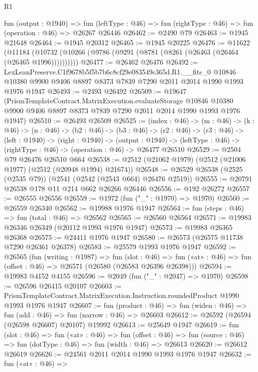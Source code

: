 \begin{lexlean}{R1}
\begin{coremodule}
  fun (output : @1940) =>
  fun (leftType : @46) => fun (rightType : @46) => fun (operation : @46) => @26267 @26446
@26462 := @2490 @79
@26463 := @1945 @21648
@26464 := @1945 @20312
@26465 := @1945 @20225
@26476 := @11622
    (@11184 (@10732 (@10266 (@9786 (@9291 (@8781 (@8261 (@26463 (@26464 (@26465 @1996))))))))))
@26477 := @26462 @26476
@26492 := LexLeanPreserve.C1f9678b5f5b7b6c8cf29e083549c365d.R1.__fits_0
    @10846
    @10380
    @9900
    @9406
    @8897
    @8373
    @7839
    @7290
    @2011
    @2014
    @1990
    @1993
    @1976
    @1947
@26493 := @2493 @26492
@26509 := @19647
    (PrismTemplateContract.MatrixExecution.evaluateStorage
      @10846
      @10380
      @9900
      @9406
      @8897
      @8373
      @7839
      @7290
      @2011
      @2014
      @1990
      @1993
      @1976
      @1947)
@26510 := @26493 @26509
@26525 := (index : @46) ->
  (m : @46) ->
  (k : @46) ->
  (n : @46) ->
  (b2 : @46) ->
  (b3 : @46) ->
  (r2 : @46) ->
  (r3 : @46) ->
  (left : @1940) ->
  (right : @1940) ->
  (output : @1940) -> (leftType : @46) -> (rightType : @46) -> (operation : @46) -> @26477 @26510
@26529 := @2504 @79 @26476 @26510 @664
@26538 := @2512 (@21062 @1979) (@2512 (@21006 @1977) (@2512 (@20948 @1994) @21674))
@26548 := @26529 @26538 (@2525 (@2535 @79)) (@2541 (@2542 (@2543 @664) @26476 @2519))
@26555 := @20791 @26538 @178 @11 @214 @662 @26266 @26446
@26556 := @192 @26272
@26557 := @26555 @26556
@26559 := @1972 (fun ("_" : @1970) => @1970)
@26560 := @26559 @26340
@26562 := @19988 @1976 @1947
@26564 := fun (steps : @46) => fun (total : @46) => @26562
@26565 := @26560 @26564
@26571 := @19983 @26346 @26349 (@20112 @1993 @1976 @1947)
@26573 := @19983 @26365 @26368
@26575 := @24411 @1976 @1947
@26580 := @26573 (@26575 @11738 @7290 @26361 @26378)
@26583 := @25579 @1993 @1976 @1947
@26592 := @26565
    (fun (writing : @1987) =>
    fun (slot : @46) =>
    fun («at» : @46) => fun (offset : @46) => @26571 (@26580 (@26583 @26396 @26398)))
@26594 := @19983 @4152 @4155
@26596 := @2049 (fun ("_" : @2047) => @1970)
@26598 := @26596 @26415 @20107
@26603 := PrismTemplateContract.MatrixExecution.Instruction.roundedProduct @1990 @1993 @1976 @1947
@26607 := fun (product : @46) =>
  fun (widen : @46) => fun (add : @46) => fun (narrow : @46) => @26603
@26612 := @26592 (@26594 (@26598 @26607) @20107) @19992
@26613 := @25649 @1947
@26619 := fun (slot : @46) =>
  fun («at» : @46) =>
  fun (offset : @46) => fun (source : @46) => fun (dotType : @46) => fun (width : @46) => @26613
@26620 := @26612 @26619
@26626 := @24561 @2011 @2014 @1990 @1993 @1976 @1947
@26632 := fun («at» : @46) =>

\end{coremodule}
\end{lexlean}
